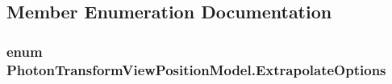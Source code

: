 \subsection{Member Enumeration Documentation}
\subsubsection[{\texorpdfstring{Extrapolate\+Options}{ExtrapolateOptions}}]{\setlength{\rightskip}{0pt plus 5cm}enum {\bf Photon\+Transform\+View\+Position\+Model.\+Extrapolate\+Options}\hspace{0.3cm}{\ttfamily [strong]}}\hypertarget{class_photon_transform_view_position_model_a81cc14379a959c4fc0e6b144360adb06}{}\label{class_photon_transform_view_position_model_a81cc14379a959c4fc0e6b144360adb06}
